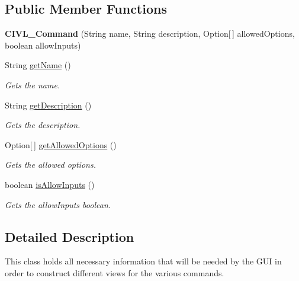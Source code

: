 \subsection*{Public Member Functions}
\begin{DoxyCompactItemize}
\item 
\hypertarget{classedu_1_1udel_1_1cis_1_1vsl_1_1civl_1_1gui_1_1common_1_1CIVL__Command_a1ee9b732a59eb4fb61bbebf237bd0e39}{}{\bfseries C\+I\+V\+L\+\_\+\+Command} (String name, String description, Option\mbox{[}$\,$\mbox{]} allowed\+Options, boolean allow\+Inputs)\label{classedu_1_1udel_1_1cis_1_1vsl_1_1civl_1_1gui_1_1common_1_1CIVL__Command_a1ee9b732a59eb4fb61bbebf237bd0e39}

\item 
String \hyperlink{classedu_1_1udel_1_1cis_1_1vsl_1_1civl_1_1gui_1_1common_1_1CIVL__Command_aa2ae512e6eb31b52f45ba8c0368b2159}{get\+Name} ()
\begin{DoxyCompactList}\small\item\em Gets the name. \end{DoxyCompactList}\item 
String \hyperlink{classedu_1_1udel_1_1cis_1_1vsl_1_1civl_1_1gui_1_1common_1_1CIVL__Command_ab497f179be8b89340599b72cabc9d769}{get\+Description} ()
\begin{DoxyCompactList}\small\item\em Gets the description. \end{DoxyCompactList}\item 
Option\mbox{[}$\,$\mbox{]} \hyperlink{classedu_1_1udel_1_1cis_1_1vsl_1_1civl_1_1gui_1_1common_1_1CIVL__Command_aa2726301efa59639943134e855eb39f4}{get\+Allowed\+Options} ()
\begin{DoxyCompactList}\small\item\em Gets the allowed options. \end{DoxyCompactList}\item 
boolean \hyperlink{classedu_1_1udel_1_1cis_1_1vsl_1_1civl_1_1gui_1_1common_1_1CIVL__Command_afc4ce17993f8031421ea1fdc2be6eaf1}{is\+Allow\+Inputs} ()
\begin{DoxyCompactList}\small\item\em Gets the allow\+Inputs boolean. \end{DoxyCompactList}\end{DoxyCompactItemize}


\subsection{Detailed Description}
This class holds all necessary information that will be needed by the G\+U\+I in order to construct different views for the various commands. 

